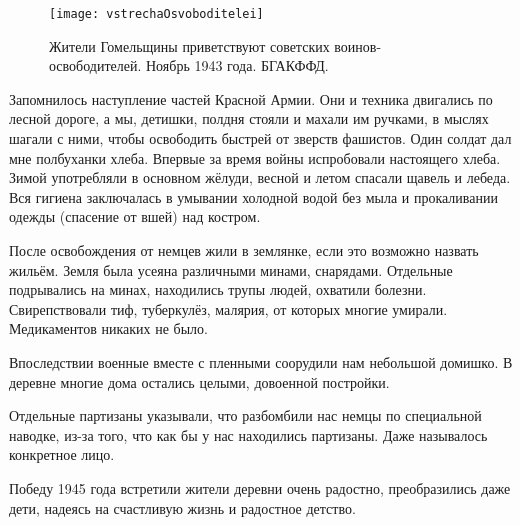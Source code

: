 \begin{wrapfigure}{O}{.4\textwidth}
\centering
\texttt{[image: vstrechaOsvoboditelei]}
\caption{Жители Гомельщины приветствуют советских воинов-освободителей. Ноябрь 1943 года. БГАКФФД.}
\label{fig:vstrechaOsvoboditelei}
\end{wrapfigure}

Запомнилось наступление частей Красной Армии. Они и техника двигались по лесной дороге, а мы, детишки, полдня стояли и махали им ручками, в мыслях шагали с ними, чтобы освободить быстрей от зверств фашистов. Один солдат дал мне полбуханки хлеба. Впервые за время войны испробовали настоящего хлеба. Зимой употребляли в основном жёлуди, весной и летом спасали щавель и лебеда. Вся гигиена заключалась в умывании холодной водой без мыла и прокаливании одежды (спасение от вшей) над костром.

После освобождения от немцев жили в землянке, если это возможно назвать жильём. Земля была усеяна различными минами, снарядами. Отдельные подрывались на минах, находились трупы людей, охватили болезни. Свирепствовали тиф, туберкулёз, малярия, от которых многие умирали. Медикаментов никаких не было. 

Впоследствии военные вместе с пленными соорудили нам небольшой домишко. В деревне многие дома остались целыми, довоенной постройки. 

Отдельные партизаны указывали, что разбомбили нас немцы по специальной наводке, из-за того, что как бы у нас находились партизаны. Даже называлось конкретное лицо. 

Победу 1945 года встретили жители деревни очень радостно, преобразились даже дети, надеясь на счастливую жизнь и радостное детство.